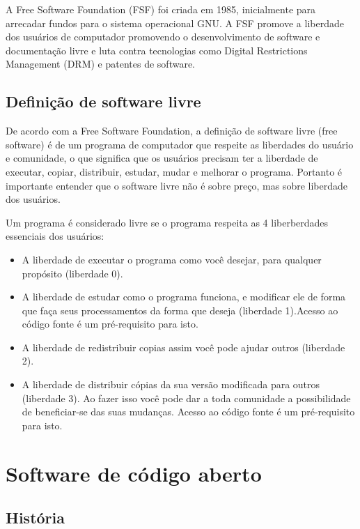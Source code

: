 \documentclass[12pt, a4paper]{report}
\begin{document}
A Free Software Foundation (FSF) foi criada em 1985, inicialmente para arrecadar fundos para o sistema operacional GNU. A FSF promove a liberdade dos usuários de computador promovendo o desenvolvimento de software e documentação livre e luta contra tecnologias como Digital Restrictions Management (DRM) e patentes de software.

\section{Definição de software livre}

De acordo com a Free Software Foundation, a definição de software livre (free software) é de um programa de computador que respeite as liberdades do usuário e comunidade, o que significa que os usuários precisam ter a liberdade de executar, copiar, distribuir, estudar, mudar e melhorar o programa. Portanto é importante entender que o software livre não é sobre preço, mas sobre liberdade dos usuários.

Um programa é considerado livre se o programa respeita as 4 liberberdades essenciais dos usuários:

\begin{itemize}

  \item{A liberdade de executar o programa como você desejar, para qualquer propósito (liberdade 0).}
  \item{A liberdade de estudar como o programa funciona, e modificar ele de forma que faça seus processamentos da forma que deseja (liberdade 1).Acesso ao código fonte é um pré-requisito para isto.}
  \item{A liberdade de redistribuir copias assim você pode ajudar outros (liberdade 2).}
  \item{A liberdade de distribuir cópias da sua versão modificada para outros (liberdade 3). Ao fazer isso você pode dar a toda comunidade a possibilidade de beneficiar-se das suas mudanças. Acesso ao código fonte é um pré-requisito para isto.}

\end{itemize}

\chapter{Software de código aberto}

\section{História}
\end{document}
